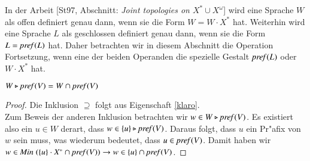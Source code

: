 


In der Arbeit [St97, Abschnitt: \emph{Joint topologies on $X^*\cup X^\omega$}] wird eine Sprache $W$ als offen definiert genau dann, wenn sie die Form $W=W\cdot X^*$ hat. Weiterhin wird eine Sprache $L$ als geschlossen definiert genau dann, wenn sie die Form $L=\mathit{pref{(}}L)$ hat. 
Daher betrachten wir in diesem Abschnitt die Operation Fortsetzung, wenn eine der beiden Operanden die spezielle Gestalt $\mathit{pref{(}}L)$ oder $W\cdot X^*$ hat. 

\vspace{2ex}

\begin{eigen}\label{spezeig1}
$W\triangleright \mathit{pref{(}}V) = W \cap \mathit{pref{(}}V)$
\end{eigen}
\begin{proof}
Die Inklusion $\supseteq$ folgt aus Eigenschaft \ref{klaro}.\\
Zum Beweis der anderen Inklusion betrachten wir $w\in W\triangleright\mathit{pref{(}}V)$. Es existiert also ein $u\in W$ derart, dass $w\in \{u\}\triangleright\mathit{pref{(}}V)$. Daraus folgt, dass $u$ ein Pr"afix von $w$ sein muss, was wiederum bedeutet, dass $u\in\mathit{pref{(}}V)$. Damit haben wir $w\in\mathit{Min}\;(\{u\}\cdot X^*\cap \mathit{pref{(}}V)) \to w\in \{u\}\cap \mathit{pref{(}}V)$.
\end{proof}


